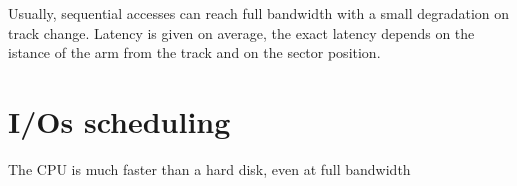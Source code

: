 \documentclass[a4paper,10pt]{article}
\begin{document}
Usually, sequential accesses can reach full bandwidth with a small degradation on track change.
Latency is given on average, the exact latency depends on the istance of the arm from the track and on the sector position.

\section{I/Os scheduling}

The CPU is much faster than a hard disk, even at full bandwidth
\end{document}
